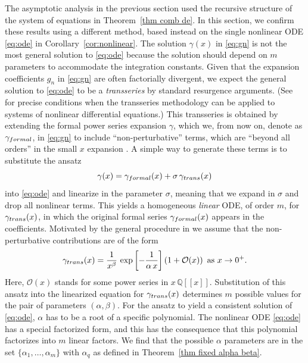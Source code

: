 \documentclass[oneside]{amsart}
\theoremstyle{definition}
\newcommand{\bigO}{\mathcal{O}}
\newcommand{\Q}{{\mathbb{Q}}}
\begin{document}
The asymptotic analysis in the previous section used the recursive structure of the system of equations in Theorem~\ref{thm comb de}. In this section, we confirm these results using a different method, based instead on the single nonlinear ODE \eqref{eq:ode} in Corollary~\ref{cor:nonlinear}. The solution $\gamma(x)$ in \eqref{eq:gn} is not the most general solution to \eqref{eq:ode} because the solution should depend on $m$ parameters to accommodate the integration constants. Given that the expansion coefficients $g_n$ in \eqref{eq:gn} are often factorially divergent, we expect the general solution to \eqref{eq:ode} to be a {\it transseries} by standard resurgence arguments. (See~\cite{costinDMJ} for precise conditions when the transseries methodology can be applied to systems of nonlinear differential equations.) This transseries is  obtained by extending the formal power series expansion $\gamma$, which we, from now on, denote as $\gamma_{\rm formal}$, in \eqref{eq:gn} to include ``non-perturbative'' terms, which are ``beyond all orders'' in the small $x$ expansion \cite{costinDMJ}. A simple way to generate these terms is to substitute the ansatz
%
\[
    \gamma(x)=\gamma_{\rm formal}(x)+\sigma\, \gamma_{\rm trans}(x)
\]
into \eqref{eq:ode} and linearize in the parameter $\sigma$, meaning that we expand in $\sigma$ and drop all nonlinear terms. This yields a homogeneous {\it linear} ODE, of order $m$, for $\gamma_{\rm trans}(x)$, in which the original formal series $\gamma_{\rm formal}(x)$ appears in the coefficients. Motivated by the general procedure in \cite{costinDMJ} we assume that the non-perturbative contributions are of the form %
\begin{eqnarray*} \gamma_{\rm trans}(x)= \frac{1}{x^\beta} \, \exp\left[-\frac{1}{\alpha\, x}\right]\left(1+\bigO(x)\right) \text{ as } x\to 0^+. \end{eqnarray*}
Here, $\bigO(x)$ stands for some power series in $x\,\Q[[x]]$.
Substitution of this ansatz into the linearized equation for $\gamma_{\rm trans}(x)$ determines $m$ possible values for the pair of parameters $(\alpha, \beta)$. For the ansatz to yield a consistent solution of \eqref{eq:ode}, $\alpha$ has to be a root of a specific polynomial. The nonlinear ODE \eqref{eq:ode} has a special factorized form, and this has the consequence that this polynomial factorizes into $m$ linear factors. We find that the possible $\alpha$ parameters are in the set $\{\alpha_1,\ldots,\alpha_m\}$ with $\alpha_q$ as defined in Theorem~\ref{thm fixed alpha beta}.
\end{document}
